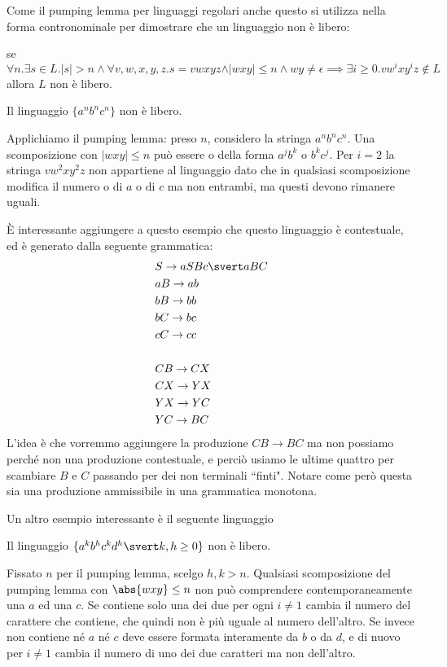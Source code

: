 \documentclass[12pt]{article}
\numberwithin{theorem}{subsection}
\begin{document}
Come il pumping lemma per linguaggi regolari anche questo si utilizza nella forma contronominale per dimostrare che un linguaggio non è libero:

se $\forall n . \exists s \in L . \vert s \vert > n \land \forall v, w, x, y, z . s = vwxyz \land \vert wxy \vert \le n \land wy \neq \epsilon \implies \exists i \ge 0 . vw^ixy^iz \notin L$ allora $L$ non è libero.

\begin{example}
	Il linguaggio $\{ a^n b^n c^n \}$ non è libero.
	
	Applichiamo il pumping lemma: preso $n$, considero la stringa $a^n b^n c^n$. Una scomposizione con $\vert wxy \vert \le n$ può essere o della forma $a^j b^k$ o $b^k c^j$. Per $i = 2$ la stringa $vw^2xy^2z$ non appartiene al linguaggio dato che in qualsiasi scomposizione modifica il numero o di $a$ o di $c$ ma non entrambi, ma questi devono rimanere uguali.
	
	È interessante aggiungere a questo esempio che questo linguaggio è contestuale, ed è generato dalla seguente grammatica:
	\begin{align*}
	&S \rightarrow aSBc \svert aBC \\
	&aB \rightarrow ab \\
	&bB \rightarrow bb \\
	&bC \rightarrow bc \\
	&cC \rightarrow cc \\
	& \\
	&CB \rightarrow CX \\
	&CX \rightarrow YX \\
	&YX \rightarrow YC \\
	&YC \rightarrow BC \\
	\end{align*}
	L'idea è che vorremmo aggiungere la produzione $CB \rightarrow BC$ ma non possiamo perché non una produzione contestuale, e perciò usiamo le ultime quattro per scambiare $B$ e $C$ passando per dei non terminali ``finti". Notare come però questa sia una produzione ammissibile in una grammatica monotona.
\end{example}

Un altro esempio interessante è il seguente linguaggio
\begin{example}
	Il linguaggio $\lbrace a^k b^h c^k d^h \svert k, h \ge 0 \rbrace$ non è libero.
	
	Fissato $n$ per il pumping lemma, scelgo $h, k > n$. Qualsiasi scomposizione del pumping lemma con $\abs{wxy} \le n$ non può comprendere contemporaneamente una $a$ ed una $c$. Se contiene solo una dei due per ogni $i \neq 1$ cambia il numero del carattere che contiene, che quindi non è più uguale al numero dell'altro. Se invece non contiene né $a$ né $c$ deve essere formata interamente da $b$ o da $d$, e di nuovo per $i \neq 1$ cambia il numero di uno dei due caratteri ma non dell'altro.
\end{example}
\end{document}
